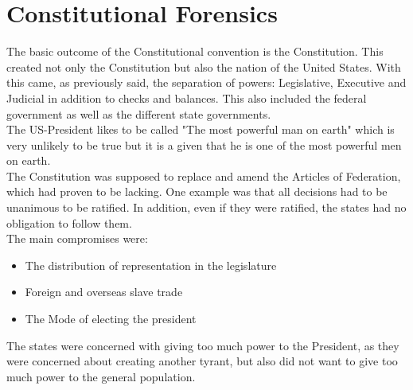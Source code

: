 \documentclass{article}
\begin{document}
	\section{Constitutional Forensics}
	The basic outcome of the Constitutional convention is the Constitution. This created not only the Constitution but also the nation of the United States. With this came, as previously said, the separation of powers: Legislative, Executive and Judicial in addition to checks and balances. This also included the federal government as well as the different state governments.\\
	The US-President likes to be called "The most powerful man on earth" which is very unlikely to be true but it is a given that he is one of the most powerful men on earth. \\
	The Constitution was supposed to replace and amend the Articles of Federation, which had proven to be lacking. One example was that all decisions had to be unanimous to be ratified. In addition, even if they were ratified, the states had no obligation to follow them. \\
	The main compromises were:
	\begin{itemize}
		\item{The distribution of representation in the legislature}
		\item{Foreign and overseas slave trade}
		\item{The Mode of electing the president}
	\end{itemize}

	The states were concerned with giving too much power to the President, as they were concerned about creating another tyrant, but also did not want to give too much power to the general population. \\
\end{document}
